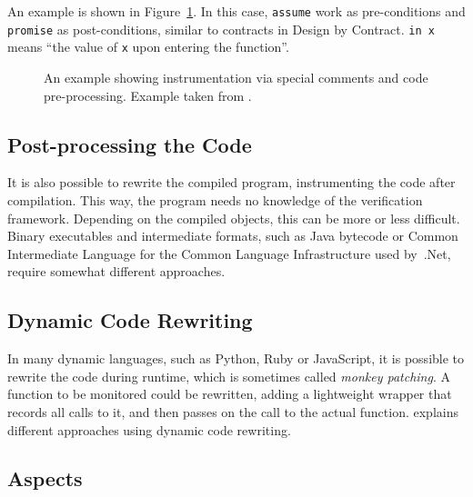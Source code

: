 An example is shown in Figure~\ref{figure-pre-processing-comments-example}. In
this case, \texttt{assume} work as pre-conditions and \texttt{promise} as
post-conditions, similar to contracts in Design by Contract. \texttt{in x}
means ``the value of \texttt{x} upon entering the function''.

\begin{figure}[h!]
	\begin{center}
	\begin{minipage}{0.7\textwidth}
    \lstset{language=C}
		
	\end{minipage}
	\end{center}
  \caption{An example showing instrumentation via special comments and code
    pre-processing. Example taken from \cite{rosenblum95practicalassertions}.}
	\label{figure-pre-processing-comments-example}
\end{figure}


\subsection{Post-processing the Code}

It is also possible to rewrite the compiled program, instrumenting the code
after compilation. This way, the program needs no knowledge of the verification
framework. Depending on the compiled objects, this can be more or less
difficult. Binary executables and intermediate formats, such as Java bytecode
or Common Intermediate Language for the Common Language Infrastructure used
by~.Net, require somewhat different approaches.


\subsection{Dynamic Code Rewriting}

In many dynamic languages, such as Python, Ruby or JavaScript, it is possible
to rewrite the code during runtime, which is sometimes called \textit{monkey
patching}. A function to be monitored could be rewritten, adding a lightweight
wrapper that records all calls to it, and then passes on the call to the actual
function. \cite{matusiak09aoppy} explains different approaches using dynamic
code rewriting.


\subsection{Aspects} \label{section-aspects}

